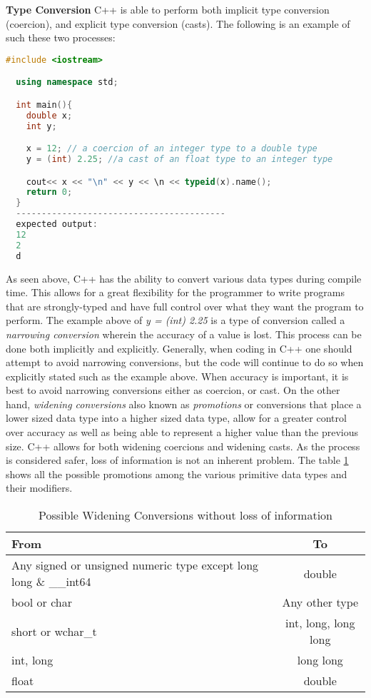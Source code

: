 \documentclass[12pt]{article}
\begin{document}
\textbf{Type Conversion} C++ is able to perform both implicit type conversion (coercion), and explicit type conversion (casts). The following is an example of such these two processes:
\begin{lstlisting}[language=C++]
  #include <iostream>

  using namespace std;

  int main(){
    double x;
    int y;

    x = 12; // a coercion of an integer type to a double type
    y = (int) 2.25; //a cast of an float type to an integer type

    cout<< x << "\n" << y << \n << typeid(x).name();
    return 0;
  }
  -----------------------------------------
  expected output:
  12
  2
  d
\end{lstlisting}

As seen above, C++ has the ability to convert various data types during compile time. This allows for a great flexibility for the programmer to write programs that are strongly-typed and have full control over what they want the program to perform. The example above of \textit{y = (int) 2.25} is a type of conversion called a \textit{narrowing conversion} wherein the accuracy of a value is lost. This process can be done both implicitly and explicitly. Generally, when coding in C++ one should attempt to avoid narrowing conversions, but the code will continue to do so when explicitly stated such as the example above. When accuracy is important, it is best to avoid narrowing conversions either as coercion, or cast. On the other hand, \textit{widening conversions} also known as \textit{promotions} or conversions that place a lower sized data type into a higher sized data type, allow for a greater control over accuracy as well as being able to represent a higher value than the previous size. C++ allows for both widening coercions and widening casts. As the process is considered safer, loss of information is not an inherent problem. The table \ref{table:DTP} shows all the possible promotions among the various primitive data types and their modifiers.

\begin{table}[h!]
  \begin{center}
    \caption{Possible Widening Conversions without loss of information}
    \label{table:DTP}
    \begin{tabular}{|l|c|}
      \toprule %
      \textbf{From} & \textbf{To} \\
      \midrule %
      Any signed or unsigned numeric type except long long \& \_\_int64 & double \\
      \hline
      bool or char & Any other type \\
      \hline
      short or wchar\_t & int, long, long long \\
      \hline
      int, long & long long \\
      \hline
      float & double \\
      \bottomrule
    \end{tabular}
  \end{center}
\end{table}
\end{document}
